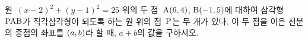 원~$(x-2)^2+(y-1)^2=25$ 위의 두 점~$\mathrm{A}(6{,}\mkern3mu\mathopen{}4)$, $\mathrm{B}(-1{,}\mkern3mu\mathopen{}5)$에 대하여 삼각형~$\mathrm{PAB}$가 직각삼각형이 되도록 하는 원 위의 점~$\mathrm{P}$는 두 개가 있다. 이 두 점을 이은 선분의 중점의 좌표를 $(a{,}\mkern3mu\mathopen{}b)$라 할 때, $a+b$의 값을 구하시오.

